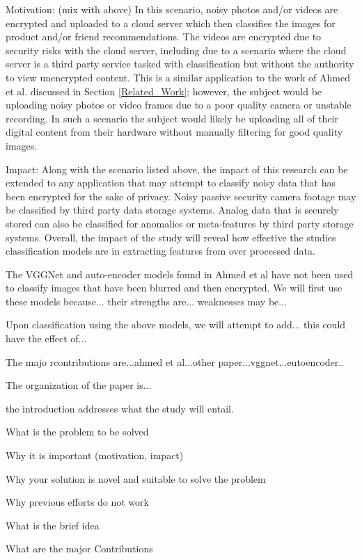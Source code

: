 \documentclass[12pt, titlepage]{article}
\begin{document}
Motivation: (mix with above)
In this scenario, noisy photos and/or videos are encrypted and uploaded to a cloud server which then classifies the images for product and/or friend recommendations. The videos are encrypted due to security risks with the cloud server, including due to a scenario where the cloud server is a third party service tasked with classification but without the authority to view unencrypted content. This is a similar application to the work of Ahmed et al. discussed in Section \ref{Related_Work}; however, the subject would be uploading noisy photos or video frames due to a poor quality camera or unstable recording. In such a scenario the subject would likely be uploading all of their digital content from their hardware without manually filtering for good quality images.

Impact: 
Along with the scenario listed above, the impact of this research can be extended to any application that may attempt to classify noisy data that has been encrypted for the sake of privacy. Noisy passive security camera footage may be classified by third party data storage systems. Analog data that is securely stored can also be classified for anomalies or meta-features by third party storage systems. Overall, the impact of the study will reveal how effective the studies classification models are in extracting features from over processed data. 


The VGGNet and auto-encoder models found in Ahmed et al have not been used to classify images that have been blurred and then encrypted. We will first use these models because... their strengths are... weaknesses may be...

Upon classification using the above models, we will attempt to add... this could have the effect of...

The majo rcontributions are...ahmed et al...other paper...vggnet...eutoencoder..

The organization of the paper is...



the introduction addresses what the study will entail. 

What is the problem to be solved

Why it is important (motivation, impact)

Why your solution is novel and suitable 
to solve the problem

Why previous efforts do not work

What is the brief idea

What are the major Contributions
\end{document}
